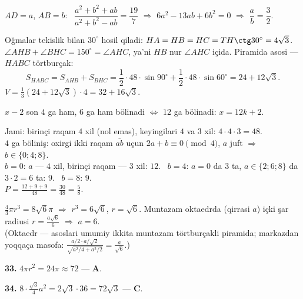 $AD=a$, $AB=b$: \ $\dfrac{a^2+b^2+ab}{a^2+b^2-ab}=\dfrac{19}7$ $\Rightarrow$ $6a^2-13ab+6b^2=0$ $\Rightarrow$ $\dfrac ab=\dfrac32$.

Oğmalar tekislik bilan $30^\circ$ hosil qiladi: $HA=HB=HC=TH\ctg30^\circ=4\sqrt3$.\\
$\angle AHB+\angle BHC=150^\circ=\angle AHC$, ya'ni $HB$ nur $\angle AHC$ içida. Piramida asosi — $HABC$ törtburçak:
\[S_{HABC}=S_{AHB}+S_{BHC}=\frac12\cdot48\cdot\sin90^\circ+\frac12\cdot48\cdot\sin60^\circ=24+12\sqrt3.\]
$V=\frac13\left(24+12\sqrt3\right)\cdot4=32+16\sqrt3$.

$x-2$ son $4$ ga ham, $6$ ga ham bölinadi $\Leftrightarrow$ $12$ ga bölinadi: $x=12k+2$.

Jami: birinçi raqam $4$ xil (nol emas), keyingilari $4$ va $3$ xil: $4\cdot4\cdot3=48$.\\
$4$ ga böliniş: oxirgi ikki raqam $\overline{ab}$ uçun $2a+b\equiv0\pmod4$, $a$ juft $\Rightarrow$ $b\in\{0;4;8\}$.\\
$b=0$: $a$ — $4$ xil, birinçi raqam — $3$ xil: $12$. \ $b=4$: $a=0$ da $3$ ta, $a\in\{2;6;8\}$ da $3\cdot2=6$ ta: $9$. \ $b=8$: $9$.\\
$P=\frac{12+9+9}{48}=\frac{30}{48}=\frac58$.

\newpage
{}
$\frac43\pi r^3=8\sqrt6\pi$ $\Rightarrow$ $r^3=6\sqrt6$, $r=\sqrt6$. Muntazam oktaedrda (qirrasi $a$) içki şar radiusi $r=\frac{a\sqrt6}6$ $\Rightarrow$ $a=6$.\\
(Oktaedr — asoslari umumiy ikkita muntazam törtburçakli piramida; markazdan yoqqaça masofa: $\frac{a/2\cdot a/\sqrt2}{\sqrt{a^2/4+a^2/2}}=\frac a{\sqrt6}$.)

\textbf{33.} $4\pi r^2=24\pi\approx72$ — \textbf{A}.

\textbf{34.} $8\cdot\frac{\sqrt3}4a^2=2\sqrt3\cdot36=72\sqrt3$ — \textbf{C}.

